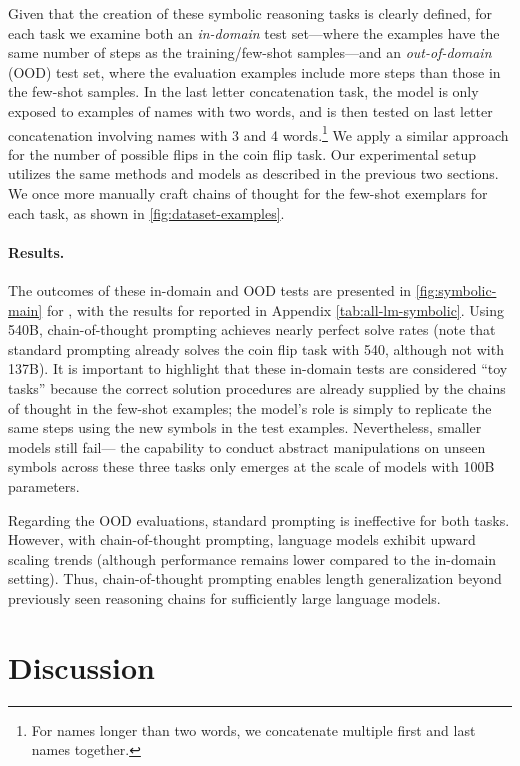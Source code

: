 Given that the creation of these symbolic reasoning tasks is clearly defined, for each task we examine both an \textit{in-domain} test set—where the examples have the same number of steps as the training/few-shot samples—and an \textit{out-of-domain} (OOD) test set, where the evaluation examples include more steps than those in the few-shot samples. In the last letter concatenation task, the model is only exposed to examples of names with two words, and is then tested on last letter concatenation involving names with 3 and 4 words.\footnote{For names longer than two words, we concatenate multiple first and last names together.} We apply a similar approach for the number of possible flips in the coin flip task. Our experimental setup utilizes the same methods and models as described in the previous two sections. We once more manually craft chains of thought for the few-shot exemplars for each task, as shown in \cref{fig:dataset-examples}.

\paragraph{Results.} 
The outcomes of these in-domain and OOD tests are presented in \cref{fig:symbolic-main} for \palm{}, with the results for \lamda{} reported in Appendix \cref{tab:all-lm-symbolic}. Using \palm{} 540B, chain-of-thought prompting achieves nearly perfect solve rates (note that standard prompting already solves the coin flip task with \palm{} 540, although not with \lamda{} 137B). It is important to highlight that these in-domain tests are considered ``toy tasks'' because the correct solution procedures are already supplied by the chains of thought in the few-shot examples; the model's role is simply to replicate the same steps using the new symbols in the test examples. Nevertheless, smaller models still fail— the capability to conduct abstract manipulations on unseen symbols across these three tasks only emerges at the scale of models with 100B parameters.

Regarding the OOD evaluations, standard prompting is ineffective for both tasks. However, with chain-of-thought prompting, language models exhibit upward scaling trends (although performance remains lower compared to the in-domain setting). Thus, chain-of-thought prompting enables length generalization beyond previously seen reasoning chains for sufficiently large language models.

\section{Discussion}\label{sec:discussion}


